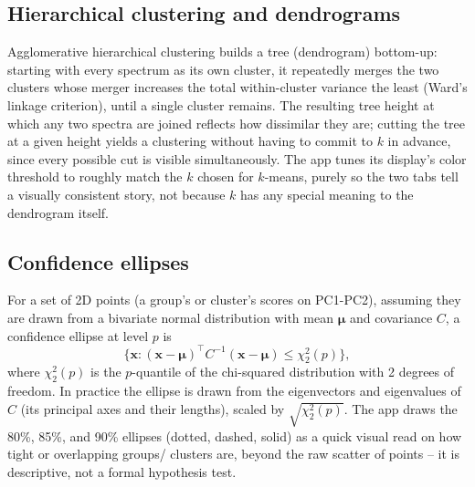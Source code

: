 \documentclass[11pt,a4paper]{article}
\begin{document}
\subsection{Hierarchical clustering and dendrograms}
\label{sec:dendrogram}
Agglomerative hierarchical clustering builds a tree (dendrogram) bottom-up:
starting with every spectrum as its own cluster, it repeatedly merges the
two clusters whose merger increases the total within-cluster variance the
least (Ward's linkage criterion), until a single cluster remains. The
resulting tree height at which any two spectra are joined reflects how
dissimilar they are; cutting the tree at a given height yields a clustering
without having to commit to $k$ in advance, since every possible cut is
visible simultaneously. The app tunes its display's color threshold to
roughly match the $k$ chosen for $k$-means, purely so the two tabs tell a
visually consistent story, not because $k$ has any special meaning to the
dendrogram itself.

\subsection{Confidence ellipses}
\label{sec:ellipses}
For a set of 2D points (a group's or cluster's scores on PC1-PC2), assuming
they are drawn from a bivariate normal distribution with mean $\boldsymbol\mu$
and covariance $C$, a confidence ellipse at level $p$ is
\[
  \Big\{ \mathbf{x} : (\mathbf{x}-\boldsymbol\mu)^\top C^{-1}
  (\mathbf{x}-\boldsymbol\mu) \le \chi^2_2(p) \Big\} ,
\]
where $\chi^2_2(p)$ is the $p$-quantile of the chi-squared distribution with
2 degrees of freedom. In practice the ellipse is drawn from the eigenvectors
and eigenvalues of $C$ (its principal axes and their lengths), scaled by
$\sqrt{\chi^2_2(p)}$. The app draws the 80\%, 85\%, and 90\% ellipses (dotted,
dashed, solid) as a quick visual read on how tight or overlapping groups/
clusters are, beyond the raw scatter of points -- it is descriptive, not a
formal hypothesis test.

\end{document}
